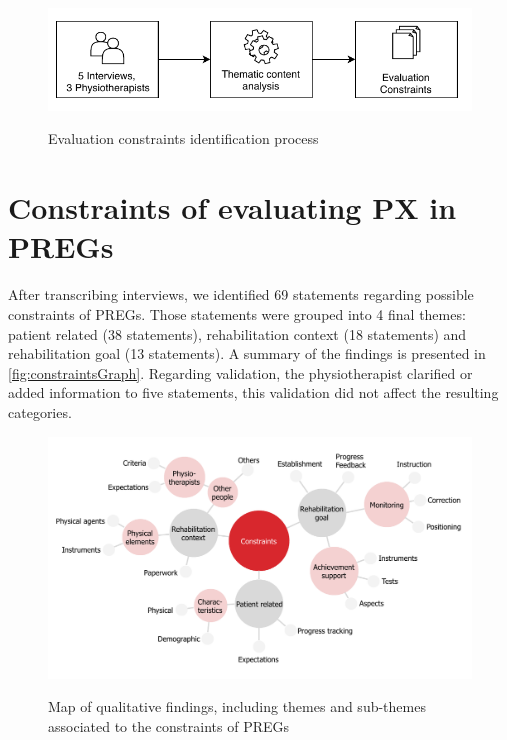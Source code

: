 \begin{figure}[htb]
\myfloatalign
{\includegraphics[width=\linewidth]{gfx/characterisation/constraintsIdentification}} \quad
\caption{Evaluation constraints identification process}\label{fig:constraintsIdentification}
\end{figure}

\section{Constraints of evaluating PX in PREGs}\label{sec:constraints} %
After transcribing interviews, we identified 69 statements regarding possible constraints of \acp{PREG}. Those statements were grouped into 4 final themes: patient related (38 statements), rehabilitation context (18 statements) and rehabilitation goal (13 statements). A summary of the findings is presented in \autoref{fig:constraintsGraph}. Regarding validation, the physiotherapist clarified or added information to five statements, this validation did not affect the resulting categories.

\begin{figure}[htb]
\myfloatalign
{\includegraphics[width=\linewidth]{gfx/characterisation/constraintsGraph}} \quad
\caption{Map of qualitative findings, including themes and sub-themes associated to the constraints of \acp{PREG}}\label{fig:constraintsGraph}
\end{figure}

